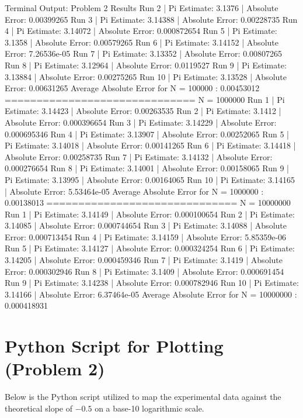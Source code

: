 \documentclass{article}
\begin{document}
\begin{outputbox}{Terminal Output: Problem 2 Results}
Run 2 | Pi Estimate: 3.1376 | Absolute Error: 0.00399265
Run 3 | Pi Estimate: 3.14388 | Absolute Error: 0.00228735
Run 4 | Pi Estimate: 3.14072 | Absolute Error: 0.000872654
Run 5 | Pi Estimate: 3.1358 | Absolute Error: 0.00579265
Run 6 | Pi Estimate: 3.14152 | Absolute Error: 7.26536e-05
Run 7 | Pi Estimate: 3.13352 | Absolute Error: 0.00807265
Run 8 | Pi Estimate: 3.12964 | Absolute Error: 0.0119527
Run 9 | Pi Estimate: 3.13884 | Absolute Error: 0.00275265
Run 10 | Pi Estimate: 3.13528 | Absolute Error: 0.00631265
Average Absolute Error for N = 100000 : 0.00453012
==============================
N = 1000000
Run 1 | Pi Estimate: 3.14423 | Absolute Error: 0.00263535
Run 2 | Pi Estimate: 3.1412 | Absolute Error: 0.000396654
Run 3 | Pi Estimate: 3.14229 | Absolute Error: 0.000695346
Run 4 | Pi Estimate: 3.13907 | Absolute Error: 0.00252065
Run 5 | Pi Estimate: 3.14018 | Absolute Error: 0.00141265
Run 6 | Pi Estimate: 3.14418 | Absolute Error: 0.00258735
Run 7 | Pi Estimate: 3.14132 | Absolute Error: 0.000276654
Run 8 | Pi Estimate: 3.14001 | Absolute Error: 0.00158065
Run 9 | Pi Estimate: 3.13995 | Absolute Error: 0.00164065
Run 10 | Pi Estimate: 3.14165 | Absolute Error: 5.53464e-05
Average Absolute Error for N = 1000000 : 0.00138013
==============================
N = 10000000
Run 1 | Pi Estimate: 3.14149 | Absolute Error: 0.000100654
Run 2 | Pi Estimate: 3.14085 | Absolute Error: 0.000744654
Run 3 | Pi Estimate: 3.14088 | Absolute Error: 0.000713454
Run 4 | Pi Estimate: 3.14159 | Absolute Error: 5.85359e-06
Run 5 | Pi Estimate: 3.14127 | Absolute Error: 0.000324254
Run 6 | Pi Estimate: 3.14205 | Absolute Error: 0.000459346
Run 7 | Pi Estimate: 3.1419 | Absolute Error: 0.000302946
Run 8 | Pi Estimate: 3.1409 | Absolute Error: 0.000691454
Run 9 | Pi Estimate: 3.14238 | Absolute Error: 0.000782946
Run 10 | Pi Estimate: 3.14166 | Absolute Error: 6.37464e-05
Average Absolute Error for N = 10000000 : 0.000418931
\end{outputbox}

\newpage    

\section{Python Script for Plotting (Problem 2)}
Below is the Python script utilized to map the experimental data against the theoretical slope of $-0.5$ on a base-10 logarithmic scale.
\end{document}
